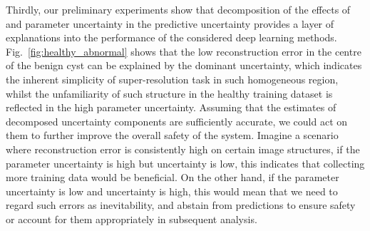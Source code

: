  Thirdly, our preliminary experiments show that decomposition of the effects of  and parameter uncertainty in the predictive uncertainty provides a layer of explanations into the performance of the considered deep learning methods. Fig.~\ref{fig:healthy_abnormal} shows that the low reconstruction error in the centre of the benign cyst can be explained by the dominant  uncertainty, which indicates the inherent simplicity of super-resolution task in such homogeneous region, whilst the unfamiliarity of such structure in the healthy training dataset is reflected in the high parameter uncertainty. Assuming that the estimates of decomposed uncertainty components are sufficiently accurate, we could act on them to further improve the overall safety of the system. Imagine a scenario where reconstruction error is consistently high on certain image structures, if the parameter uncertainty is high but  uncertainty is low, this indicates that collecting more training data would be beneficial. On the other hand, if the parameter uncertainty is low and  uncertainty is high, this would mean that we need to regard such errors as inevitability, and abstain from predictions to ensure safety or account for them appropriately in subsequent analysis.
 
